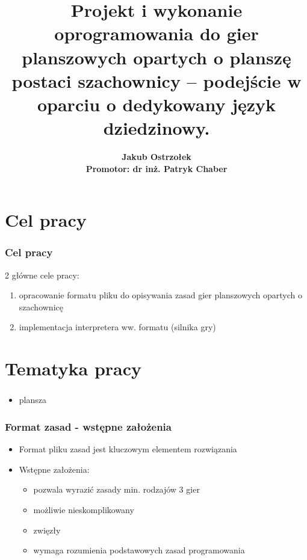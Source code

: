 \documentclass{beamer}
\title[Silnik gier opartych o szachownicę \insertframenumber/\inserttotalframenumber]{
   Projekt i wykonanie oprogramowania do gier planszowych opartych
   o planszę postaci szachownicy – podejście w oparciu o dedykowany
   język dziedzinowy.}
\author[Jakub Ostrzołek]{\textbf{Jakub Ostrzołek \\%
\footnotesize Promotor: dr inż. Patryk Chaber}}
\institute{Instytut Automatyki i Technik Informacyjnych\\%
Politechnika Warszawska}
\begin{document}
\frame{\titlepage}


\section{Cel pracy}
\begin{frame}
   \frametitle{Cel pracy}
   2 główne cele pracy:
   \begin{enumerate}
      \item opracowanie formatu pliku do opisywania zasad gier planszowych opartych o szachownicę
      \item implementacja interpretera ww. formatu (silnika gry)
   \end{enumerate}
\end{frame}

\section{Tematyka pracy}

\begin{frame}
   \frametitle{}
   \begin{itemize}
      \item plansza 
   \end{itemize}
\end{frame}

\begin{frame}
   \frametitle{Format zasad - wstępne założenia}
   \begin{itemize}
      \item Format pliku zasad jest kluczowym elementem rozwiązania
      \item Wstępne założenia:
            \begin{itemize}
               \item pozwala wyrazić zasady min. rodzajów 3 gier
               \item możliwie nieskomplikowany
               \item zwięzły
               \item wymaga rozumienia podstawowych zasad programowania
            \end{itemize}
   \end{itemize}
\end{frame}
\end{document}
